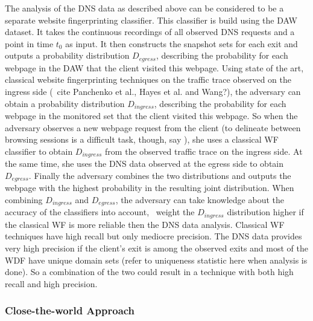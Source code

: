 The analysis of the DNS data as described above can be considered to be
a separate website fingerprinting classifier. This classifier is build
using the DAW dataset. It takes the continuous recordings of all
observed DNS requests and a point in time $t_0$ as input. It then
constructs the snapshot sets for each exit and outputs a probability
distribution $D_{egress}$, describing the probability for each webpage
in the DAW that the client visited this webpage.
%
Using state of the art, classical website fingerprinting techniques on
the traffic trace observed on the ingress side (\eg~cite Panchenko et
al., Hayes et al. and Wang?), the adversary can obtain a probability
distribution $D_{ingress}$, describing the probability for each webpage
in the monitored set that the client visited this webpage.
%
So when the adversary observes a new webpage request from the client (to
delineate between browsing sessions is a difficult task, though, say
\cite{Coull2007a}), she uses a classical WF classifier to obtain
$D_{ingress}$ from the observed traffic trace on the ingress side. At
the same time, she uses the DNS data observed at the egress side to
obtain $D_{egress}$.  Finally the adversary combines the two
distributions and outputs the webpage with the highest probability in
the resulting joint distribution.
%
When combining $D_{ingress}$ and $D_{egress}$, the adversary can take
knowledge about the accuracy of the classifiers into account, \eg~weight
the $D_{ingress}$ distribution higher if the classical WF is more
reliable then the DNS data analysis.
%
Classical WF techniques have high recall but only mediocre precision.
The DNS data provides very high precision if the client's exit is among
the observed exits and most of the WDF have unique domain sets (refer to
uniqueness statistic here when analysis is done). So a combination of
the two could result in a technique with both high recall and high
precision.


\subsubsection{Close-the-world Approach}

